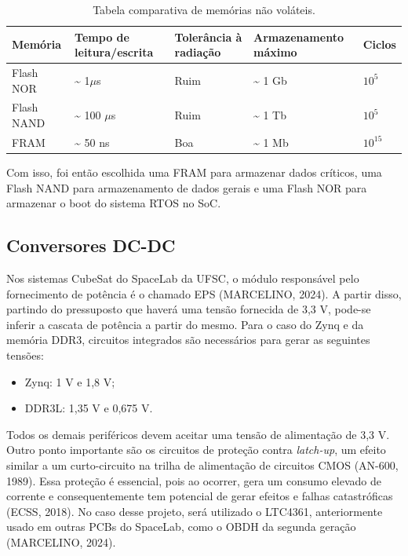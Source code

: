 \begin{table}[H]
	\ABNTEXfontereduzida
	\caption{\label{tab:memnvol}Tabela comparativa de memórias não voláteis.}
    \centering
    \begin{tabular}{@{} >{\centering}p{2cm} >{\centering}p{3cm} >{\centering}p{3cm} >{\centering}p{3cm}>{\centering}p{3cm} @{}}
    
		\toprule
		\textbf{Memória} & \textbf{Tempo de leitura/escrita} & \textbf{Tolerância à radiação} & \textbf{Armazenamento máximo} & \textbf{Ciclos} \tabularnewline 
        \midrule
        Flash NOR & \textasciitilde{} 1$\mu$s & Ruim & \textasciitilde{} 1 Gb & \textbf{$10^5$} \tabularnewline
        
        \midrule
        Flash NAND & \textasciitilde{} 100 $\mu$s & Ruim &\textasciitilde{} 1 Tb & \textbf{$10^5$} \tabularnewline 

        \midrule
        FRAM & \textasciitilde{} 50 ns & Boa & \textasciitilde{} 1 Mb & \textbf{$10^{15}$}  \tabularnewline 
        
        \bottomrule
	\end{tabular}
\end{table}

Com isso, foi então escolhida uma FRAM para armazenar dados críticos, uma Flash NAND para armazenamento de dados gerais e uma Flash NOR para armazenar o boot do sistema RTOS no SoC.

\subsection{Conversores DC-DC}
Nos sistemas CubeSat do SpaceLab da UFSC, o módulo responsável pelo fornecimento de potência é o chamado EPS (MARCELINO, 2024). A partir disso, partindo do pressuposto que haverá uma tensão fornecida de 3,3 V, pode-se inferir a cascata de potência a partir do mesmo. Para o caso do Zynq e da memória DDR3, circuitos integrados são necessários para gerar as seguintes tensões: 

\begin{itemize}
	\item Zynq: 1 V e 1,8 V; 
	\item DDR3L: 1,35 V e 0,675 V.
\end{itemize}

Todos os demais periféricos devem aceitar uma tensão de alimentação de 3,3 V. Outro ponto importante são os circuitos de proteção contra \textit{latch-up}, um efeito similar a um curto-circuito na trilha de alimentação de circuitos CMOS (AN-600, 1989). Essa proteção é essencial, pois ao ocorrer, gera um consumo elevado de corrente e consequentemente tem potencial de gerar efeitos e falhas catastróficas (ECSS, 2018). No caso desse projeto, será utilizado o LTC4361, anteriormente usado em outras PCBs do SpaceLab, como o OBDH da  segunda geração (MARCELINO, 2024). 

